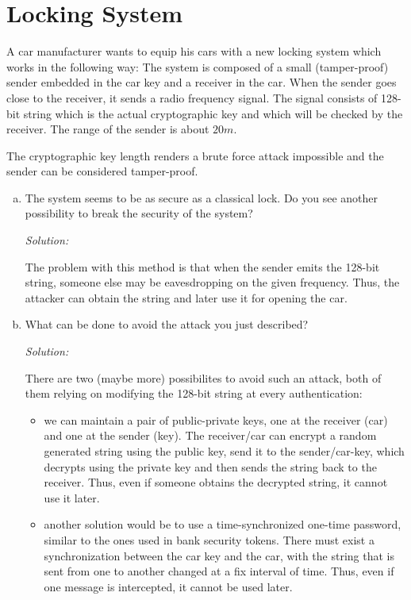 \documentclass[a4paper,11pt]{article}
\newcommand{\includeonlyinsolution}[1]{\ifsolution#1\fi}
\newenvironment{solution}%
{\par{\noindent\small\textit{Solution:}}\vspace{-12pt}\begin{framed}}%
{\end{framed}\par}
\begin{document}
\section{Locking System}
A car manufacturer wants to equip his cars with a new locking system which works in
the following way: The system is composed of a small (tamper-proof) sender embedded
in the car key and a receiver in the car. When the sender goes close to the
receiver, it sends a radio frequency signal. The signal consists of 128-bit string which is the
actual cryptographic key and which will be checked by the receiver. The range of the
sender is about $20m$.

The cryptographic key length renders a brute force attack impossible and the sender
can be considered tamper-proof.
\begin{enumerate}[(a)]
\item The system seems to be as secure as a classical lock. Do you see another
possibility to break the security of the system?
\includeonlyinsolution{\begin{solution}
The problem with this method is that when the sender emits the 128-bit string, someone
else may be eavesdropping on the given frequency. Thus, the attacker can obtain the
string and later use it for opening the car.
\end{solution}}

\item What can be done to avoid the attack you just described?
\includeonlyinsolution{\begin{solution}
There are two (maybe more) possibilites to avoid such an attack, both of them
relying on modifying the 128-bit string at every authentication:
\begin{itemize}
  \item we can maintain a pair of public-private keys, one at the receiver (car) and one
  at the sender (key). The receiver/car can encrypt a random generated string using the public
  key, send it to the sender/car-key, which decrypts using the private key and then sends
  the string back to the receiver. Thus, even if someone obtains the decrypted string, it cannot
  use it later.
  \item another solution would be to use a time-synchronized one-time password, similar to the ones
  used in bank security tokens. There must exist a synchronization between the car key and the car,
  with the string that is sent from one to another changed at a fix interval of time. Thus, even if
  one message is intercepted, it cannot be used later.
\end{itemize}
\end{solution}}


\end{enumerate}
\end{document}

